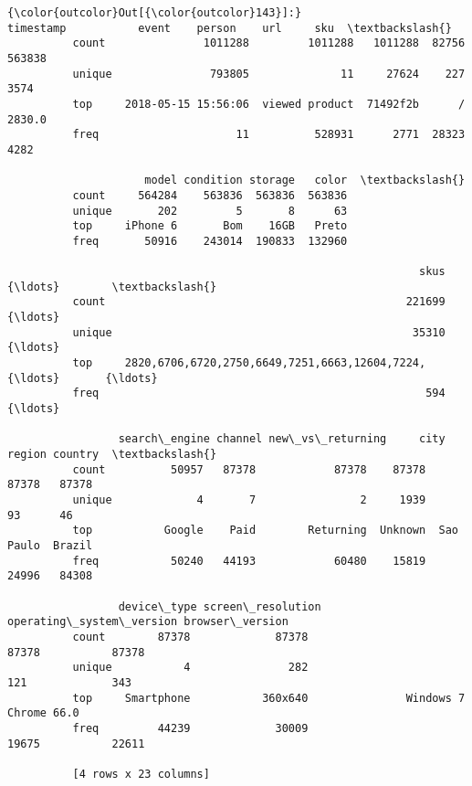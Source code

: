 \documentclass[11pt]{article}
\begin{document}
\begin{Verbatim}[commandchars=\\\{\}]
{\color{outcolor}Out[{\color{outcolor}143}]:}                   timestamp           event    person    url     sku  \textbackslash{}
          count               1011288         1011288   1011288  82756  563838   
          unique               793805              11     27624    227    3574   
          top     2018-05-15 15:56:06  viewed product  71492f2b      /  2830.0   
          freq                     11          528931      2771  28323    4282   
          
                     model condition storage   color  \textbackslash{}
          count     564284    563836  563836  563836   
          unique       202         5       8      63   
          top     iPhone 6       Bom    16GB   Preto   
          freq       50916    243014  190833  132960   
          
                                                               skus       {\ldots}        \textbackslash{}
          count                                              221699       {\ldots}         
          unique                                              35310       {\ldots}         
          top     2820,6706,6720,2750,6649,7251,6663,12604,7224,{\ldots}       {\ldots}         
          freq                                                  594       {\ldots}         
          
                 search\_engine channel new\_vs\_returning     city     region country  \textbackslash{}
          count          50957   87378            87378    87378      87378   87378   
          unique             4       7                2     1939         93      46   
          top           Google    Paid        Returning  Unknown  Sao Paulo  Brazil   
          freq           50240   44193            60480    15819      24996   84308   
          
                 device\_type screen\_resolution operating\_system\_version browser\_version  
          count        87378             87378                    87378           87378  
          unique           4               282                      121             343  
          top     Smartphone           360x640               Windows 7      Chrome 66.0  
          freq         44239             30009                    19675           22611  
          
          [4 rows x 23 columns]
\end{Verbatim}
            
\end{document}
